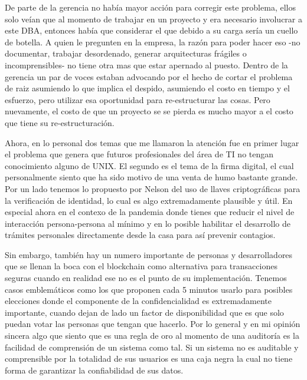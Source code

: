 \documentclass[11pt]{utalcaDoc}
\begin{document}
De parte de la gerencia no había mayor acción para corregir este problema, ellos solo veían que al momento de trabajar en un proyecto y era necesario involucrar a este DBA, entonces había que considerar el que debido a su carga sería un cuello de botella. A quien le pregunten en la empresa, la razón para poder hacer eso -no documentar, trabajar desordenado, generar arquitecturas frágiles o incomprensibles- no tiene otra mas que estar apernado al puesto. Dentro de la gerencia un par de voces estaban advocando por el hecho de cortar el problema de raiz asumiendo lo que implica el despido, asumiendo el costo en tiempo y el esfuerzo, pero utilizar esa oportunidad para re-estructurar las cosas. Pero nuevamente, el costo de que un proyecto se se pierda es mucho mayor a el costo que tiene su re-estructuración.

Ahora, en lo personal dos temas que me llamaron la atención fue en primer lugar el problema que genera que futuros profesionales del área de TI no tengan conocimiento alguno de UNIX. El segundo es el tema de la firma digital, el cual personalmente siento que ha sido motivo de una venta de humo bastante grande. Por un lado tenemos lo propuesto por Nelson del uso de llaves criptográficas para la verificación de identidad, lo cual es algo extremadamente plausible y útil. En especial ahora en el contexo de la pandemia donde tienes que reducir el nivel de interacción persona-persona al mínimo y en lo posible habilitar el desarrollo de trámites personales directamente desde la casa para así prevenir contagios.

Sin embargo, también hay un numero importante de personas y desarrolladores que se llenan la boca con el blockchain como alternativa para transacciones seguras cuando en realidad ese no es el punto de su implementación. Tenemos casos emblemáticos como los que proponen cada 5 minutos usarlo para posibles elecciones donde el componente de la confidencialidad es extremadamente importante, cuando dejan de lado un factor de disponibilidad que es que solo puedan votar las personas que tengan que hacerlo. Por lo general y en mi opinión sincera algo que siento que es una regla de oro al momento de una auditoría es la facilidad de comprensión de un sistema como tal. Si un sistema no es auditable y comprensible por la totalidad de sus usuarios es una caja negra la cual no tiene forma de garantizar la confiabilidad de sus datos.
\end{document}
